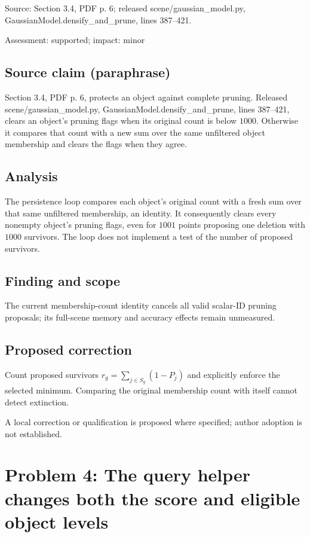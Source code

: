 \documentclass[11pt]{article}
\begin{document}
Source: Section 3.4, PDF p. 6; released scene/gaussian\_model.py, GaussianModel.densify\_and\_prune, lines 387–421.

Assessment: supported; impact: minor

\subsection*{Source claim (paraphrase)}

Section 3.4, PDF p. 6, protects an object against complete pruning. Released scene/gaussian\_model.py, GaussianModel.densify\_and\_prune, lines 387–421, clears an object's pruning flags when its original count is below \(1000\). Otherwise it compares that count with a new sum over the same unfiltered object membership and clears the flags when they agree.

\subsection*{Analysis}

The persistence loop compares each object's original count with a fresh sum over that same unfiltered membership, an identity. It consequently clears every nonempty object's pruning flags, even for \(1001\) points proposing one deletion with \(1000\) survivors. The loop does not implement a test of the number of proposed survivors.

\subsection*{Finding and scope}

The current membership-count identity cancels all valid scalar-ID pruning proposals; its full-scene memory and accuracy effects remain unmeasured.

\subsection*{Proposed correction}

Count proposed survivors \(r_g=\sum_{j\in S_g}(1-P_j)\) and explicitly enforce the selected minimum. Comparing the original membership count with itself cannot detect extinction.

A local correction or qualification is proposed where specified; author adoption is not established.

\section*{Problem 4: The query helper changes both the score and eligible object levels}
\end{document}
